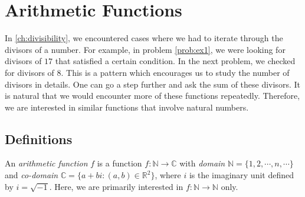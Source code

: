 \chapter{Arithmetic Functions}\label{ch:arithfunc}

In \autoref{ch:divisibility}, we encountered cases where we had to iterate through the divisors of a number. For example, in problem \ref{prob:ex1}, we were looking for divisors of $17$ that satisfied a certain condition. In the next problem, we checked for divisors of $8$. This is a pattern which encourages us to study the number of divisors in details. One can go a step further and ask the sum of these divisors. It is natural that we would encounter more of these functions repeatedly. Therefore, we are interested in similar functions that involve natural numbers.
\section{Definitions}

	\begin{definition}
		An \textit{arithmetic function} $f$ is a function $f : \mathbb{N} \to \mathbb{C} $ with \textit{domain} $\mathbb{N} = \{1, 2, \cdots, n, \cdots\}$ and \textit{co-domain} $\mathbb{C} = \{a+bi: (a,b)\in \mathbb{R}^2 \}$, where $i$ is the imaginary unit defined by $i=\sqrt{-1}$. Here, we are primarily interested in $f:\mathbb{N}\to\mathbb{N}$ only.
	\end{definition}

